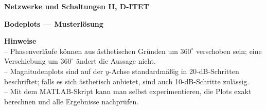 \documentclass[a4paper,12pt]{article}
\begin{document}
\begin{titlepage}
\thispagestyle{firstpage}
\vspace*{4cm}
\begin{center}
{\Large\bfseries Netzwerke und Schaltungen II, D-ITET\par}
\vspace{3mm}
{\Huge\bfseries Bodeplots — Musterlösung\par}
\vspace{9mm}
\end{center}
\vfill
\begingroup\footnotesize
\textbf{Hinweise}\\[2pt]
– Phasenverläufe können aus ästhetischen Gründen um $360^\circ$ verschoben sein; eine Verschiebung um $360^\circ$ ändert die Aussage nicht.\\
– Magnitudenplots sind auf der $y$-Achse standardmäßig in 20-dB-Schritten beschriftet; falls es sich ästhetisch anbietet, sind auch 10-dB-Schritte zulässig.\\
– Mit dem MATLAB-Skript kann man selbst experimentieren, die Plots exakt berechnen und alle Ergebnisse nachprüfen.\\
\endgroup
\vfill
\end{titlepage}








 













\end{document}
